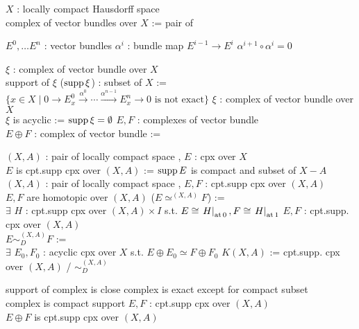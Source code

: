 \begin{Definition}[ベクトル束の複体]
\itemdefi
  \For \(X\) : locally compact Hausdorff space \\
  \Define complex of vector bundles over \(X\) := pair of
  \begin{itemize}
    \itemenum \(E^0 , \ldots E^n\) : vector bundles
    \itemenum \(\alpha^i\) : bundle map \(E^{i-1} \to E^{i}\)
    \itemwith \(\alpha^{i+1} \circ \alpha^i = 0\)
  \end{itemize}
\itemdefi
  \For \(\xi\) : complex of vector bundle over \(X\) \\
  \Define support of \(\xi\) (\(\text{supp} \, {\xi}\)) : subset of \(X\) := \\
  \(\{x \in X \mid 0 \to E^0_x \overset{\alpha^0}{\to} \cdots \overset{\alpha^{n-1}}{\to} E^n_x \to 0 \text{ is not exact}\}\)
\itemdefi
  \For \(\xi\) : complex of vector bundle over \(X\) \\
  \Define \(\xi\) is acyclic := \(\text{supp} \, {\xi} = \emptyset\)
\itemdefi
  \For \(E,F\) : complexes of vector bundle \\
  \Define \(E \oplus F\) : complex of vector bundle := 
\end{Definition}

\begin{Definition}[空間対の上のベクトル束]
\itemdefi
  \For \((X,A)\) : pair of locally compact space , \(E\) : cpx over \(X\) \\
  \Define \(E\) is cpt.supp cpx over \((X,A)\) := \(\text{supp} \, {E}\) is compact and subset of \(X-A\)
\itemdefi
  \For \((X,A)\) : pair of locally compact space , \(E,F\) : cpt.supp cpx over \((X,A)\) \\
  \Define \(E,F\) are homotopic over \((X,A)\) (\(E \simeq^{(X,A)} F\)) := \\
  \(\exists\) \(H\) : cpt.supp cpx over \((X,A) \times I\) s.t. \(E \cong \left. {H} \right| _{\text{at} \, {0}} , F \cong \left. {H} \right| _{\text{at} \, {1}}\)
\itemdefi
  \For \(E,F\) : cpt.supp. cpx over \((X,A)\) \\
  \Define \(E \sim_{D}^{(X,A)} F\) := \\
  \(\exists\) \(E_0,F_0\) : acyclic cpx over \(X\) s.t. \(E \oplus E_0 \simeq F \oplus F_0\)
\itemdefi
  \Define \(K(X,A)\) := cpt.supp. cpx over \((X,A)\) / \(\sim_{D}^{(X,A)}\)
\end{Definition}

\begin{Theorem}
\itemprop
  \Then support of complex is close
\itemprop
  \IfHold complex is exact except for compact subset \\
  \Then complex is compact support
\itemprop
  \For \(E,F\) : cpt.supp cpx over \((X,A)\) \\
  \Then \(E \oplus F\) is cpt.supp cpx over \((X,A)\)
\end{Theorem}

